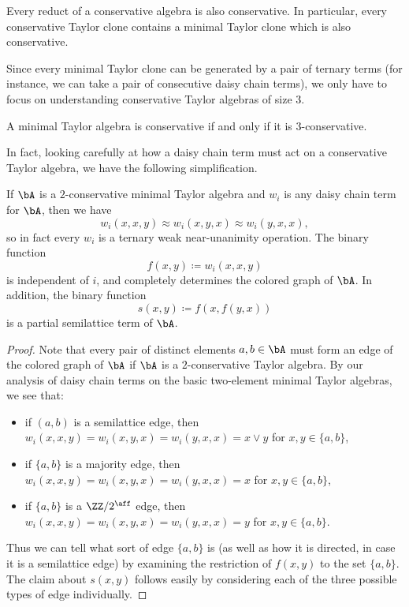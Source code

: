 \begin{prop} Every reduct of a conservative algebra is also conservative. In particular, every conservative Taylor clone contains a minimal Taylor clone which is also conservative.
\end{prop}

Since every minimal Taylor clone can be generated by a pair of ternary terms (for instance, we can take a pair of consecutive daisy chain terms), we only have to focus on understanding conservative Taylor algebras of size $3$.

\begin{prop}\label{3-conservative} A minimal Taylor algebra is conservative if and only if it is $3$-conservative.
\end{prop}

In fact, looking carefully at how a daisy chain term must act on a conservative Taylor algebra, we have the following simplification.

\begin{prop}\label{conservative-ternary} If $\bA$ is a $2$-conservative minimal Taylor algebra and $w_i$ is any daisy chain term for $\bA$, then we have
\[
w_i(x,x,y) \approx w_i(x,y,x) \approx w_i(y,x,x),
\]
so in fact every $w_i$ is a ternary weak near-unanimity operation. The binary function
\[
f(x,y) \coloneqq w_i(x,x,y)
\]
is independent of $i$, and completely determines the colored graph of $\bA$. In addition, the binary function
\[
s(x,y) \coloneqq f(x,f(y,x))
\]
is a partial semilattice term of $\bA$.
\end{prop}
\begin{proof} Note that every pair of distinct elements $a,b \in \bA$ must form an edge of the colored graph of $\bA$ if $\bA$ is a $2$-conservative Taylor algebra. By our analysis of daisy chain terms on the basic two-element minimal Taylor algebras, we see that:
\begin{itemize}
\item if $(a,b)$ is a semilattice edge, then $w_i(x,x,y) = w_i(x,y,x) = w_i(y,x,x) = x \vee y$ for $x,y \in \{a,b\}$,
\item if $\{a,b\}$ is a majority edge, then $w_i(x,x,y) = w_i(x,y,x) = w_i(y,x,x) = x$ for $x,y \in \{a,b\}$,
\item if $\{a,b\}$ is a $\ZZ/2^{\aff}$ edge, then $w_i(x,x,y) = w_i(x,y,x) = w_i(y,x,x) = y$ for $x,y \in \{a,b\}$.
\end{itemize}
Thus we can tell what sort of edge $\{a,b\}$ is (as well as how it is directed, in case it is a semilattice edge) by examining the restriction of $f(x,y)$ to the set $\{a,b\}$. The claim about $s(x,y)$ follows easily by considering each of the three possible types of edge individually.
\end{proof}

